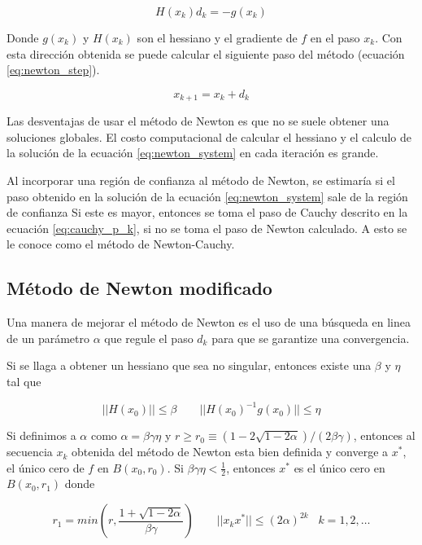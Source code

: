 \begin{equation}
    H(x_k) d_k = -g(x_k) \label{eq:newton_system}
\end{equation}

Donde $g(x_k)$ y $H(x_k)$ son el hessiano y el gradiente de $f$ en el paso $x_k$. Con esta dirección obtenida se puede calcular el siguiente paso del método (ecuación \ref{eq:newton_step}).

\begin{equation}
    x_{k+1} = x_k + d_k \label{eq:newton_step}
\end{equation}

Las desventajas de usar el método de Newton es que no se suele obtener una soluciones globales. El costo computacional de calcular el hessiano y el calculo de la solución de la ecuación \ref{eq:newton_system} en cada iteración es grande.

Al incorporar una región de confianza al método de Newton, se estimaría si el paso obtenido en la solución de la ecuación \ref*{eq:newton_system} sale de la región de confianza Si este es mayor, entonces se toma el paso de Cauchy descrito en la ecuación \ref*{eq:cauchy_p_k}, si no se toma el paso de Newton calculado. A esto se le conoce como el método de Newton-Cauchy.



\subsection{Método de Newton modificado}


Una manera de mejorar el método de Newton es el uso de una búsqueda en linea de un parámetro $\alpha$ que regule el paso $d_k$ para que se garantize una convergencia.

Si se llaga a obtener un hessiano que sea no singular, entonces existe una $\beta$ y $\eta$ tal que

\begin{equation*}
    ||H(x_0)|| \leq \beta \qquad ||H(x_0)^{-1}g(x_0)|| \leq \eta
\end{equation*}

Si definimos a $\alpha$ como $\alpha=\beta \gamma \eta$ y $r\geq r_0\equiv (1-2\sqrt{1-2\alpha})/(2\beta \gamma)$, entonces al secuencia ${x_k}$ obtenida del método de Newton esta bien definida y converge a $x^*$, el único cero de $f$ en $B(x_0,r_0)$. Si $\beta \gamma \eta <\frac{1}{2}$, entonces $x^*$ es el único cero en $B(x_0,r_1)$ donde

\begin{equation*}
    r_1 = min\left(r, \frac{1+\sqrt{1-2\alpha}}{\beta \gamma}\right)  \qquad ||x_k x^*|| \leq (2\alpha)^{2k} \;\;\; k=1,2,\dots
\end{equation*}

